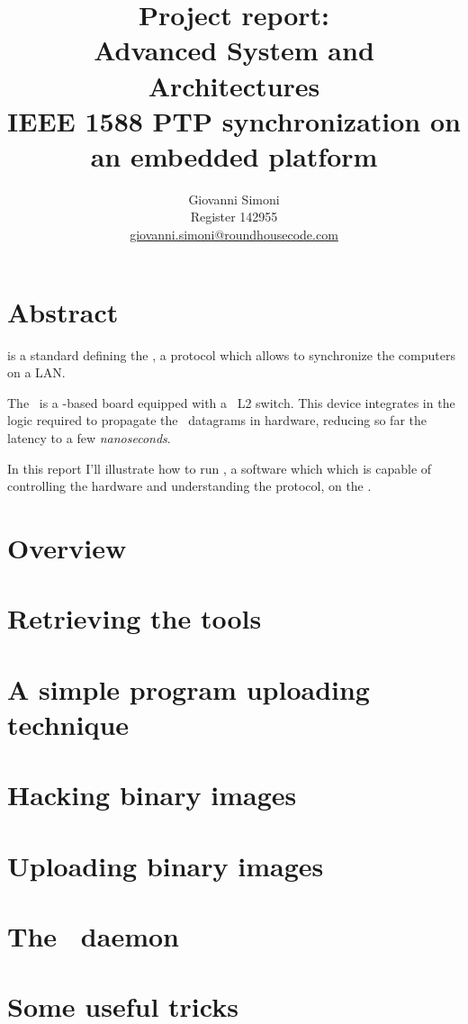 \documentclass[10pt,a4paper]{article}
\title {
    Project report:\\
    Advanced System and Architectures\\
    IEEE 1588 PTP synchronization on an embedded platform
}
\author{
    Giovanni Simoni\\
    Register 142955\\
    \href{mailto:giovanni.simoni@roundhousecode.com}
         {giovanni.simoni@roundhousecode.com}
}
\begin{document}
\maketitle

    \section*{ \center Abstract }

         is a standard defining the , a protocol which allows to synchronize the
        computers on a LAN.

        The \MyBoard\ is a \PPC-based board equipped with a
        \Vitesse\ L2 switch. This device integrates in the logic required
        to propagate the \PTP\ datagrams in hardware, reducing so far the
        latency to a few \emph{nanoseconds}.

        In this report I'll illustrate how to run \PTPd, a software which
        which is capable of controlling the hardware and understanding the
        protocol, on the \MyBoard.

    \newpage
    \tableofcontents

    \newpage
    \section{ Overview } \label{sec:Overview}
    

    \newpage
    \section{ Retrieving the tools } \label{sec:GetTools}
    

    \newpage
    \section{ A simple program uploading technique } \label{sec:Upload}
    

    \newpage
    \section{ Hacking binary images } \label{sec:HackImages}
    

    \newpage
    \section{ Uploading binary images } \label{sec:UploadImages}
    

    \newpage
    \section{ The \PTP\ daemon } \label{sec:PTPd}
    

    \newpage
    \section{ Some useful tricks } \label{sec:Tricks}
    

\end{document}
